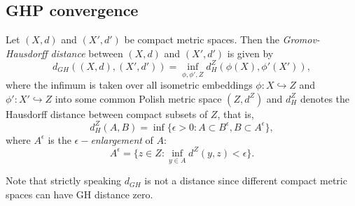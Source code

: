 
\subsection*{GHP convergence} 
Let $(X, d)$ and $(X', d')$ be compact metric spaces. Then the {\em Gromov-Hausdorff distance} between $(X, d)$ and $(X', d')$ is given by $$d_{GH}((X,d),(X',d'))=\inf\limits_{\phi,\phi', Z}d_H^Z(\phi(X),\phi'(X')),$$ where the infimum is taken over all isometric embeddings $\phi:X\hookrightarrow Z$ and $\phi': X'\hookrightarrow Z$ into some common Polish metric space $(Z, d^Z)$ and $d_H^Z$ denotes the Hausdorff distance between compact subsets of $Z$, that is, $$d_H^Z(A,B)=\inf\{\epsilon>0: A\subset B^\epsilon, B\subset A^\epsilon\},$$ where $A^\epsilon$ is the {\em $\epsilon-$enlargement} of $A$: $$A^\epsilon=\{z\in Z: \inf\limits_{y\in A} d^Z(y, z)<\epsilon\}.$$

Note that strictly speaking $d_{GH}$ is not a distance since different compact metric spaces can have GH distance zero.

